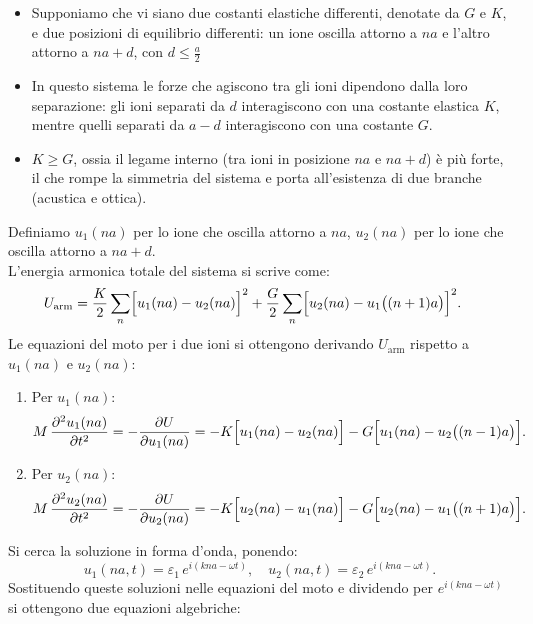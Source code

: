 \begin{itemize}
    \item Supponiamo che vi siano due costanti elastiche differenti, denotate da \(G\) e \(K\), e due posizioni di equilibrio differenti: un ione oscilla attorno a \(na\) e l'altro attorno a \(na+d\), con \(d\leq \frac{a}{2}\)
    \item In questo sistema le forze che agiscono tra gli ioni dipendono dalla loro separazione: gli ioni separati da \(d\) interagiscono con una costante elastica \(K\), mentre quelli separati da \(a-d\) interagiscono con una costante \(G\). 
    \item \(K \geq G\), ossia il legame interno (tra ioni in posizione \(na\) e \(na+d\)) è più forte, il che rompe la simmetria del sistema e porta all'esistenza di due branche (acustica e ottica).
\end{itemize}
Definiamo $u_1(na)$ per lo ione che oscilla attorno a $na$, $u_2(na)$ per lo ione che oscilla attorno a $na+d$.\\
L'energia armonica totale del sistema si scrive come:
\begin{equation}
\begin{split}
    U_{\text{arm}} &= \frac{K}{2}\sum_{n} \Bigl[u_1(na) - u_2(na)\Bigr]^2 
    + \frac{G}{2}\sum_{n} \Bigl[u_2(na) - u_1\bigl((n+1)a\bigr)\Bigr]^2.
\end{split}
\end{equation}
Le equazioni del moto per i due ioni si ottengono derivando \(U_{\text{arm}}\) rispetto a \(u_1(na)\) e \(u_2(na)\):
\begin{enumerate}
    \item Per \(u_1(na)\):
    \begin{equation}
    M\,\frac{\partial^2 u_1(na)}{\partial t^2} = -\frac{\partial U}{\partial u_1(na)} = -K\Bigl[u_1(na) - u_2(na)\Bigr] - G\Bigl[u_1(na) - u_2\bigl((n-1)a\bigr)\Bigr].
    \end{equation}
    \item Per \(u_2(na)\):
    \begin{equation}
    M\,\frac{\partial^2 u_2(na)}{\partial t^2} = -\frac{\partial U}{\partial u_2(na)} = -K\Bigl[u_2(na) - u_1(na)\Bigr] - G\Bigl[u_2(na) - u_1\bigl((n+1)a\bigr)\Bigr].
    \end{equation}
\end{enumerate}
Si cerca la soluzione in forma d'onda, ponendo:
\[
u_1(na,t) = \varepsilon_1\, e^{i( kna - \omega t)},\quad
u_2(na,t) = \varepsilon_2\, e^{i( kna - \omega t)}.
\]
Sostituendo queste soluzioni nelle equazioni del moto e dividendo per \(e^{i( kna - \omega t)}\) si ottengono due equazioni algebriche:
